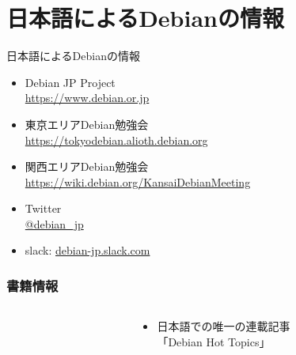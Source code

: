 \documentclass[cjk,c,squeeze,shrink,dvipdfmx,12pt,handout]{beamer}
\begin{document}
\section{日本語によるDebianの情報}

\begin{frame}[fragile]{日本語によるDebianの情報}
  \begin{itemize}
  \item Debian JP Project \\
    \url{https://www.debian.or.jp}
  \item 東京エリアDebian勉強会\\
    \url{https://tokyodebian.alioth.debian.org}
  \item 関西エリアDebian勉強会 \\
    \url{https://wiki.debian.org/KansaiDebianMeeting}
  \item Twitter \\
    \url{@debian_jp}
  \item slack:
    \url{debian-jp.slack.com}
  \end{itemize}
\end{frame}

\begin{frame}
  \frametitle{書籍情報}
  \begin{columns}
    \begin{column}{.5\paperwidth}
      \centering
    \end{column}
    \begin{column}{.5\paperwidth}
      \begin{itemize}
      \item %
        日本語での唯一の連載記事 \\
        「Debian Hot Topics」
      \end{itemize}
    \end{column}
  \end{columns}
\end{frame}
\end{document}
